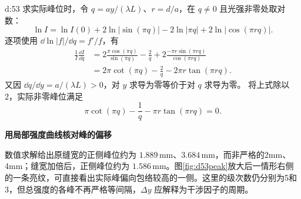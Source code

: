 \begin{drillsolution}{d:53}
求实际峰位时，令 \(q=ay/(\lambda L)\)、\(r=d/a\)，在 $q\ne0$ 且光强非零处取对数：
\[
 \ln I=\ln I(0)+2\ln|\sin(\pi q)|-2\ln|\pi q|
       +2\ln|\cos(\pi rq)|.
\]
逐项使用 $\dd\ln|f|/\dd q=f'/f$，有
\begin{align*}
 \frac1I\frac{\dd I}{\dd q}
 &=2\frac{\pi\cos(\pi q)}{\sin(\pi q)}
   -\frac2q+2\frac{-\pi r\sin(\pi rq)}{\cos(\pi rq)}\\
 &=2\pi\cot(\pi q)-\frac2q-2\pi r\tan(\pi rq).
\end{align*}
又因 $\dd q/\dd y=a/(\lambda L)>0$，对 $y$ 求导为零等价于对 $q$ 求导为零。
将上式除以2，实际非零峰位满足
\[
 \pi\cot(\pi q)-\frac1q-\pi r\tan(\pi rq)=0.
\]


\par\medskip{}\noindent\textbf{用局部强度曲线核对峰的偏移}\par\nobreak
数值求解给出原缝宽的正侧峰位约为 \(1.889\,\mathrm{mm}\)、\(3.684\,\mathrm{mm}\)，而非严格的2mm、4mm；缝宽加倍后，正侧峰位约为 \(1.586\,\mathrm{mm}\)。图\ref{fig:d53peak}放大后一情形右侧的一条亮纹，可直接看出实际峰偏向包络较高的一侧。这里的级次数仍分别为5和3，但总强度的各峰不再严格等间隔，\(\Delta y\) 应解释为干涉因子的周期。

\end{drillsolution}

